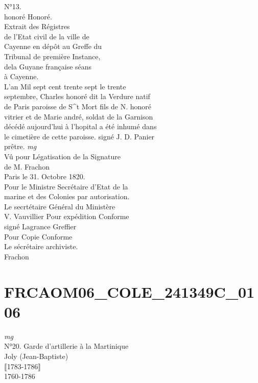 \documentclass{article}
\begin{document}
\begin{pages}
N°13.\\
honoré
\normalsize \pstart
Honoré.\\
Extrait des Régistres\\
de l'Etat civil de la ville de\\
Cayenne en dépôt au Greffe du\\
Tribunal de première Instance,\\
dela Guyane française séans\\
à Cayenne.\\
L'an Mil sept cent trente sept le trente\\
septembre, Charles honoré dit la Verdure natif\\
de Paris paroisse de S\^{}t Mort fils de N. honoré\\
vitrier et de Marie andré, soldat de la Garnison\\
décédé aujourd'hui à l'hopital a été inhumé dans\\
le cimetière de cette paroisse. signé J. D. Panier\\
prêtre.
\pend
\vspace{0.5cm}\noindent
\textit{mg}
\footnotesize \\
Vû pour Légatisation de la Signature\\
de M. Frachon\\
Paris le 31. Octobre 1820.\\
Pour le Ministre Secrétaire d'Etat de la\\
marine et des Colonies par autorisation.\\
Le secrtétaire Général du Ministère\\
V. Vauvillier
\normalsize \pstart
Pour expédition Conforme\\
signé Lagrance Greffier\\
Pour Copie Conforme\\
Le sécrétaire archiviste.\\
Frachon
\pend
\endnumbering\beginnumbering\section{FRCAOM06\_COLE\_241349C\_0106}
\vspace{0.5cm}\noindent
\textit{mg}
\footnotesize \\
N°20.
\normalsize \pstart
Garde d'artillerie à la Martinique\\
Joly (Jean-Baptiste)\\
⟦1783-1786⟧\\
1760-1786\\

\end{pages}
\end{document}
